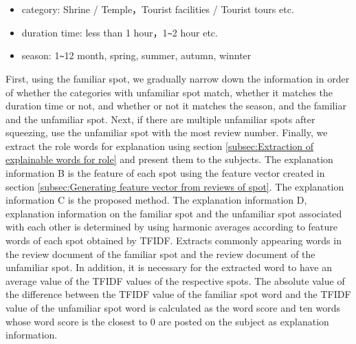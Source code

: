 \documentclass[journal]{IAENGtran}
\begin{document}
\begin{itemize}
\item category: Shrine / Temple，Tourist facilities / Tourist tours etc.
\item duration time: less than 1 hour，1\verb|~|2 hour etc.
\item season: 1\verb|~|12 month, spring, summer, autumn, winnter
\end{itemize}

First, using the familiar spot, we gradually narrow down the information in order of whether the categories with unfamiliar spot match, whether it matches the duration time or not, and whether or not it matches the season, and the familiar and the unfamiliar spot.
Next, if there are multiple unfamiliar spots after squeezing, use the unfamiliar spot with the most review number.
Finally, we extract the role words for explanation using section \ref{subsec:Extraction of explainable words for role} and present them to the subjects.
The explanation information B is the feature of each spot using the feature vector created in section \ref{subsec:Generating feature vector from reviews of spot}.
The explanation information C is the proposed method.
The explanation information D, explanation information on the familiar spot and the unfamiliar spot associated with each other is determined by using harmonic averages according to feature words of each spot obtained by TFIDF.
Extracts commonly appearing words in the review document of the familiar spot and the review document of the unfamiliar spot.
In addition, it is necessary for the extracted word to have an average value of the TFIDF values ​​of the respective spots.
The absolute value of the difference between the TFIDF value of the familiar spot word and the TFIDF value of the unfamiliar spot word is calculated as the word score and ten words whose word score is the closest to 0 are posted on the subject as explanation information.
\end{document}
